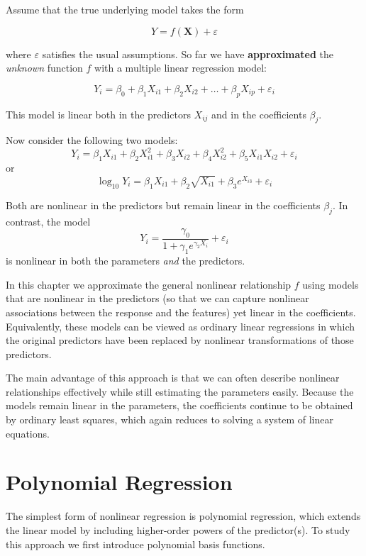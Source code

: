 \documentclass[
]{book}
\begin{document}
Assume that the true underlying model takes the form

\[Y = f(\mathbf{X}) + \varepsilon\]

where \(\varepsilon\) satisfies the usual assumptions. So far we have \textbf{approximated} the \emph{unknown} function \(f\) with a multiple linear regression model:

\[Y_i = \beta_0 + \beta_1 X_{i1} +  \beta_2 X_{i2} +\ldots +  \beta_p X_{ip} +\varepsilon_i \]

This model is linear both in the predictors \(X_{ij}\) and in the coefficients \(\beta_j\).

Now consider the following two models:
\[Y_i = \beta_1 X_{i1} +  \beta_2 X_{i1}^2 +\beta_3 X_{i2} + \beta_4 X_{i2}^2 +  \beta_5 X_{i1} X_{i2} +\varepsilon_i \]
or
\[\log_{10}Y_i = \beta_1 X_{i1} +  \beta_2 \sqrt{X_{i1}} +\beta_3 e^{X_{i3}} +\varepsilon_i\]

Both are nonlinear in the predictors but remain linear in the coefficients \(\beta_j\).
In contrast, the model
\[Y_i =  \frac{\gamma_0}{1+ \gamma_1 e^{\gamma_2 X_i}} + \varepsilon_i \]
is nonlinear in both the parameters \emph{and} the predictors.

In this chapter we approximate the general nonlinear relationship \(f\) using models that are nonlinear in the predictors (so that we can capture nonlinear associations between the response and the features) yet linear in the coefficients. Equivalently, these models can be viewed as ordinary linear regressions in which the original predictors have been replaced by nonlinear transformations of those predictors.

The main advantage of this approach is that we can often describe nonlinear relationships effectively while still estimating the parameters easily. Because the models remain linear in the parameters, the coefficients continue to be obtained by ordinary least squares, which again reduces to solving a system of linear equations.

\section{Polynomial Regression}\label{polynomial-regression}

The simplest form of nonlinear regression is polynomial regression, which extends the linear model by including higher-order powers of the predictor(s). To study this approach we first introduce polynomial basis functions.

~
\end{document}
